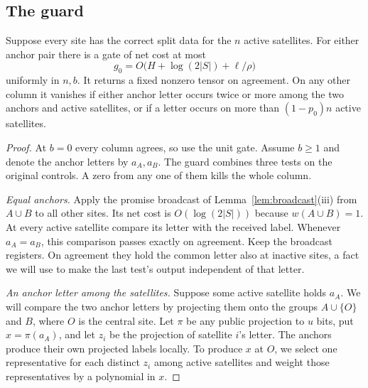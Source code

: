 \subsection{The guard}

\begin{lemma}[Guard]\label{lem:guard}
Suppose every site has the correct split data for the \(n\) active
satellites. For either anchor pair there is a gate of net cost at most
\[
       g_0=O\bigl(H+\log(2|S|)+\ell/\rho\bigr)
\]
uniformly in \(n,b\). It returns a fixed nonzero tensor on agreement.
On any other column it vanishes if either anchor letter occurs twice
or more among the two anchors and active satellites, or if a letter
occurs on more than \((1-p_0)n\) active satellites.
\end{lemma}

\begin{proof}
At \(b=0\) every column agrees, so use the unit gate. Assume \(b\ge1\)
and denote the anchor letters by \(a_A,a_B\). The guard combines three
tests on the original controls. A zero from any one of them kills the
whole column.

\emph{Equal anchors.}
Apply the promise broadcast of Lemma~\ref{lem:broadcast}(iii) from
\(A\cup B\) to all other sites. Its net cost is \(O(\log(2|S|))\)
because \(w(A\cup B)=1\). At every active satellite compare its letter
with the received label. Whenever \(a_A=a_B\), this comparison passes
exactly on agreement. Keep the broadcast registers. On agreement they
hold the common letter also at inactive sites, a fact we will use to
make the last test's output independent of that letter.

\emph{An anchor letter among the satellites.}
Suppose some active satellite holds \(a_A\). We will compare the two
anchor letters by projecting them onto the groups \(A\cup\{O\}\)
and \(B\), where \(O\) is the central site. Let \(\pi\) be any public
projection to \(u\) bits, put \(x=\pi(a_A)\), and let \(z_i\) be the
projection of satellite \(i\)'s letter. The anchors produce their own
projected labels locally. To produce \(x\) at \(O\), we select one
representative for each distinct \(z_i\) among active satellites and
weight those representatives by a polynomial in \(x\).


\end{proof}
